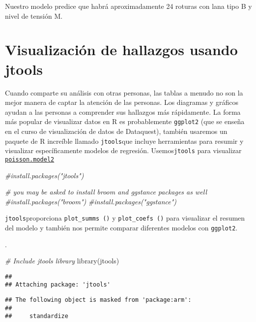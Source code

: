 \documentclass[
]{book}
\newenvironment{Shaded}{\begin{snugshade}}{\end{snugshade}}
\newcommand{\CommentTok}[1]{\textcolor[rgb]{0.56,0.35,0.01}{\textit{#1}}}
\newcommand{\FunctionTok}[1]{\textcolor[rgb]{0.00,0.00,0.00}{#1}}
\newcommand{\NormalTok}[1]{#1}
\begin{document}
Nuestro modelo predice que habrá aproximadamente 24 roturas con lana tipo B y nivel de tensión M.

\hypertarget{visualizaciuxf3n-de-hallazgos-usando-jtools}{%
\chapter{Visualización de hallazgos usando jtools}\label{visualizaciuxf3n-de-hallazgos-usando-jtools}}

Cuando comparte su análisis con otras personas, las tablas a menudo no son la mejor manera de captar la atención de las personas. Los diagramas y gráficos ayudan a las personas a comprender sus hallazgos más rápidamente. La forma más popular de visualizar datos en R es probablemente \texttt{ggplot2} (que se enseña en el curso de visualización de datos de Dataquest), también usaremos un paquete de R increíble llamado \texttt{jtools}que incluye herramientas para resumir y visualizar específicamente modelos de regresión. Usemos\texttt{jtools} para visualizar \underline{\texttt{poisson.model2}}

\begin{Shaded}
\begin{Highlighting}[]
\CommentTok{\#install.packages("jtools")}

\CommentTok{\# you may be asked to install \textquotesingle{}broom\textquotesingle{} and \textquotesingle{}ggstance\textquotesingle{} packages as well}
\CommentTok{\#install.packages("broom")}
\CommentTok{\#install.packages("ggstance")}
\end{Highlighting}
\end{Shaded}

\texttt{jtools}proporciona \texttt{plot\_summs\ ()} y \texttt{plot\_coefs\ ()} para visualizar el resumen del modelo y también nos permite comparar diferentes modelos con \texttt{ggplot2}.

.

\begin{Shaded}
\begin{Highlighting}[]
\CommentTok{\# Include jtools library}
\FunctionTok{library}\NormalTok{(jtools)}
\end{Highlighting}
\end{Shaded}

\begin{verbatim}
## 
## Attaching package: 'jtools'
\end{verbatim}

\begin{verbatim}
## The following object is masked from 'package:arm':
## 
##     standardize
\end{verbatim}
\end{document}
